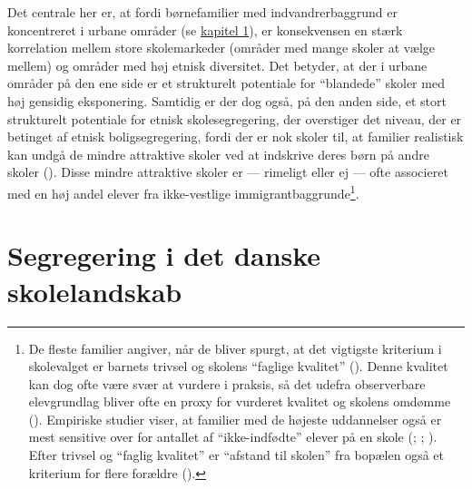 \documentclass[
]{book}
\begin{document}
Det centrale her er, at fordi børnefamilier med indvandrerbaggrund er koncentreret i urbane områder (se \hyperref[kap1]{kapitel 1}), er konsekvensen en stærk korrelation mellem store skolemarkeder (områder med mange skoler at vælge mellem) og områder med høj etnisk diversitet. Det betyder, at der i urbane områder på den ene side er et strukturelt potentiale for ``blandede'' skoler med høj gensidig eksponering. Samtidig er der dog også, på den anden side, et stort strukturelt potentiale for etnisk skolesegregering, der overstiger det niveau, der er betinget af etnisk boligsegregering, fordi der er nok skoler til, at familier realistisk kan undgå de mindre attraktive skoler ved at indskrive deres børn på andre skoler (). Disse mindre attraktive skoler er --- rimeligt eller ej --- ofte associeret med en høj andel elever fra ikke-vestlige immigrantbaggrunde\footnote{De fleste familier angiver, når de bliver spurgt, at det vigtigste kriterium i skolevalget er barnets trivsel og skolens ``faglige kvalitet'' (). Denne kvalitet kan dog ofte være svær at vurdere i praksis, så det udefra observerbare elevgrundlag bliver ofte en proxy for vurderet kvalitet og skolens omdømme (). Empiriske studier viser, at familier med de højeste uddannelser også er mest sensitive over for antallet af ``ikke-indfødte'' elever på en skole (; ; ). Efter trivsel og ``faglig kvalitet'' er ``afstand til skolen'' fra bopælen også et kriterium for flere forældre ().}.

\section{Segregering i det danske skolelandskab}\label{segregering-i-det-danske-skolelandskab}
\end{document}

